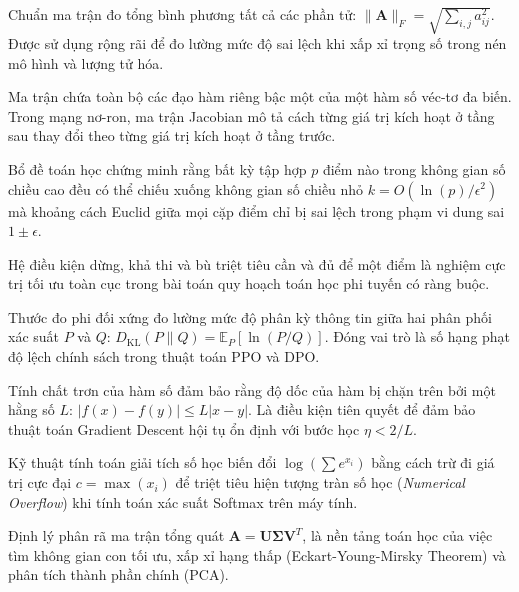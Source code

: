 \begin{description}[leftmargin=2.5cm, style=nextline]
  \item[\term{Frobenius Norm}] Chuẩn ma trận đo tổng bình phương tất cả các phần tử: $\|\mathbf{A}\|_F = \sqrt{\sum_{i,j} a_{ij}^2}$. Được sử dụng rộng rãi để đo lường mức độ sai lệch khi xấp xỉ trọng số trong nén mô hình và lượng tử hóa.

  \item[\term{Jacobian Matrix}] Ma trận chứa toàn bộ các đạo hàm riêng bậc một của một hàm số véc-tơ đa biến. Trong mạng nơ-ron, ma trận Jacobian mô tả cách từng giá trị kích hoạt ở tầng sau thay đổi theo từng giá trị kích hoạt ở tầng trước.

  \item[\term{Johnson-Lindenstrauss Lemma}] Bổ đề toán học chứng minh rằng bất kỳ tập hợp $p$ điểm nào trong không gian số chiều cao đều có thể chiếu xuống không gian số chiều nhỏ $k = O(\ln(p)/\epsilon^2)$ mà khoảng cách Euclid giữa mọi cặp điểm chỉ bị sai lệch trong phạm vi dung sai $1 \pm \epsilon$.

  \item[\term{KKT Conditions (Karush-Kuhn-Tucker)}] Hệ điều kiện dừng, khả thi và bù triệt tiêu cần và đủ để một điểm là nghiệm cực trị tối ưu toàn cục trong bài toán quy hoạch toán học phi tuyến có ràng buộc.

  \item[\term{Kullback-Leibler (KL) Divergence}] Thước đo phi đối xứng đo lường mức độ phân kỳ thông tin giữa hai phân phối xác suất $P$ và $Q$: $D_{\text{KL}}(P \parallel Q) = \mathbb{E}_P[\ln(P/Q)]$. Đóng vai trò là số hạng phạt độ lệch chính sách trong thuật toán PPO và DPO.

  \item[\term{Lipschitz Continuity}] Tính chất trơn của hàm số đảm bảo rằng độ dốc của hàm bị chặn trên bởi một hằng số $L$: $|f(x) - f(y)| \le L |x - y|$. Là điều kiện tiên quyết để đảm bảo thuật toán Gradient Descent hội tụ ổn định với bước học $\eta < 2/L$.

  \item[\term{Log-Sum-Exp Trick}] Kỹ thuật tính toán giải tích số học biến đổi $\log(\sum e^{x_i})$ bằng cách trừ đi giá trị cực đại $c = \max(x_i)$ để triệt tiêu hiện tượng tràn số học (\textit{Numerical Overflow}) khi tính toán xác suất Softmax trên máy tính.

  \item[\term{Singular Value Decomposition (SVD)}] Định lý phân rã ma trận tổng quát $\mathbf{A} = \mathbf{U} \mathbf{\Sigma} \mathbf{V}^T$, là nền tảng toán học của việc tìm không gian con tối ưu, xấp xỉ hạng thấp (Eckart-Young-Mirsky Theorem) và phân tích thành phần chính (PCA).
\end{description}

